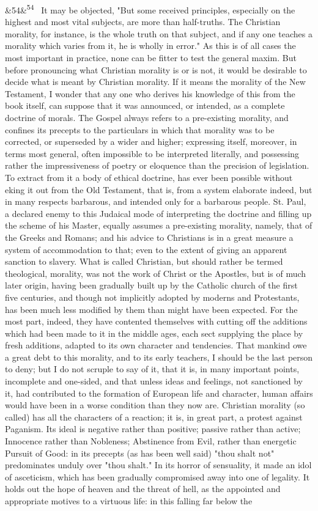 \documentclass[12pt]{article}
\newcommand{\para}[1][]{\par\noindent\ifx&#1&\else\textsuperscript{\footnotesize #1}~\fi}
\begin{document}
\para[54] It may be objected, "But some received principles, especially on the highest and most vital subjects, are more than half-truths. The Christian morality, for instance, is the whole truth on that subject, and if any one teaches a morality which varies from it, he is wholly in error." As this is of all cases the most important in practice, none can be fitter to test the general maxim. But before pronouncing what Christian morality is or is not, it would be desirable to decide what is meant by Christian morality. If it means the morality of the New Testament, I wonder that any one who derives his knowledge of this from the book itself, can suppose that it was announced, or intended, as a complete doctrine of morals. The Gospel always refers to a pre-existing morality, and confines its precepts to the particulars in which that morality was to be corrected, or superseded by a wider and higher; expressing itself, moreover, in terms most general, often impossible to be interpreted literally, and possessing rather the impressiveness of poetry or eloquence than the precision of legislation. To extract from it a body of ethical doctrine, has ever been possible without eking it out from the Old Testament, that is, from a system elaborate indeed, but in many respects barbarous, and intended only for a barbarous people. St. Paul, a declared enemy to this Judaical mode of interpreting the doctrine and filling up the scheme of his Master, equally assumes a pre-existing morality, namely, that of the Greeks and Romans; and his advice to Christians is in a great measure a system of accommodation to that; even to the extent of giving an apparent sanction to slavery. What is called Christian, but should rather be termed theological, morality, was not the work of Christ or the Apostles, but is of much later origin, having been gradually built up by the Catholic church of the first five centuries, and though not implicitly adopted by moderns and Protestants, has been much less modified by them than might have been expected. For the most part, indeed, they have contented themselves with cutting off the additions which had been made to it in the middle ages, each sect supplying the place by fresh additions, adapted to its own character and tendencies. That mankind owe a great debt to this morality, and to its early teachers, I should be the last person to deny; but I do not scruple to say of it, that it is, in many important points, incomplete and one-sided, and that unless ideas and feelings, not sanctioned by it, had contributed to the formation of European life and character, human affairs would have been in a worse condition than they now are. Christian morality (so called) has all the characters of a reaction; it is, in great part, a protest against Paganism. Its ideal is negative rather than positive; passive rather than active; Innocence rather than Nobleness; Abstinence from Evil, rather than energetic Pursuit of Good: in its precepts (as has been well said) "thou shalt not" predominates unduly over "thou shalt." In its horror of sensuality, it made an idol of asceticism, which has been gradually compromised away into one of legality. It holds out the hope of heaven and the threat of hell, as the appointed and appropriate motives to a virtuous life: in this falling far below the 
\end{document}
